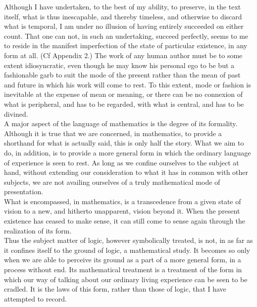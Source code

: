 \documentclass[a4paper]{article}
\theoremstyle{remark}
\begin{document}
Although  I  have  undertaken,  to  the  best  of  my  ability,  to  preserve, in the  text  itself, what  is thus  inescapable, and  thereby  timeless, and  otherwise  to  discard  what  is temporal,  I am  under  no  illusion  of  having  entirely  succeeded  on  either  count.  That  one  can  not,  in  such  an  undertaking,  succeed  perfectly,  seems  to  me  to  reside  in  the  manifest   imperfection   of  the  state   of   particular   existence,   in  any  form  at  all.  (Cf  Appendix  2.)  The  work   of   any   human   author   must   be  to   some   extent   idio­syncratic,  even  though  he may know his personal ego to  be but  a  fashionable  garb  to  suit  the mode  of the  present  rather  than  the  mean  of  past  and  future  in  which  his  work  will  come  to  rest.  To  this  extent,  mode  or  fashion  is  inevitable  at  the  expense  of  mean  or  meaning,  or  there  can  be  no  connexion   of  what  is  peripheral,  and  has  to  be  regarded,  with  what  is  central,  and  has  to  be  divined. \\

A  major  aspect  of  the  language  of  mathematics  is  the  degree  of  its  formality.  Although  it  is  true  that  we  are  concerned,  in  mathematics,  to  provide  a  shorthand  for  what  is  actually  said,  this  is  only  half  the  story.  What  we  aim  to  do,  in  addition,  is  to  provide  a  more  general  form  in  which  the  ordinary  language  of  experience  is  seen  to  rest.  As  long  as  we  confine  ourselves  to  the  subject  at  hand,  without   extending  our  consideration   to   what  it  has  in  common  with  other  subjects,  we are  not  availing  ourselves  of  a  truly  mathematical  mode  of  presentation.  \\

What  is encompassed,  in mathematics,  is a transcedence  from  a  given  state  of  vision  to  a  new,  and  hitherto  unapparent,  vision  beyond  it. When  the present  existence has ceased  to make  sense,  it  can  still  come  to  sense  again  through  the  realization  of  its  form. \\

Thus   the   subject   matter   of   logic,   however    symbolically    treated,  is  not,  in  as  far  as  it  confines  itself  to  the  ground   of   logic,  a  mathematical  study.  It  becomes  so  only  when  we  are  able  to  perceive  its  ground  as  a  part  of  a  more  general  form,  in   a   process   without   end.   Its   mathematical   treatment   is   a   treatment  of  the  form  in  which  our  way  of  talking  about  our  ordinary  living  experience  can  be  seen  to  be  cradled.  It  is  the  laws of this form, rather than those of logic, that  I have  attempted  to  record. \\
\end{document}
